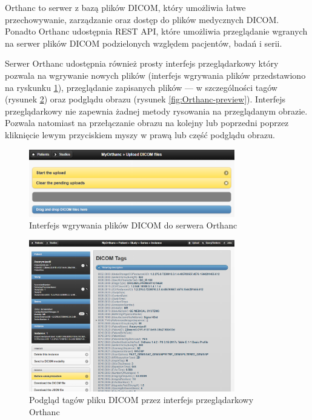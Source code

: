 \documentclass[a4paper,11pt,twoside]{report}
\theoremstyle{definition}
\begin{document}
Orthanc to serwer z bazą plików DICOM, który umożliwia łatwe przechowywanie, zarządzanie oraz dostęp do plików medycznych DICOM. Ponadto Orthanc udostępnia REST API, które umożliwia przeglądanie wgranych na serwer plików DICOM podzielonych względem pacjentów, badań i serii. 

Serwer Orthanc udostępnia również prosty interfejs przeglądarkowy który pozwala na wgrywanie nowych plików (interfejs wgrywania plików przedstawiono na ryskunku \ref{fig:Orthanc-upload}), przeglądanie zapisanych plików --- w szczególności tagów (rysunek \ref{fig:Orthanc-tags}) oraz podglądu obrazu (rysunek \ref{fig:Orthanc-preview}). Interfejs przeglądarkowy nie zapewnia żadnej metody rysowania na przeglądanym obrazie. Pozwala natomiast na przełączanie obrazu na kolejny lub poprzedni poprzez kliknięcie lewym przyciskiem myszy w prawą lub część podglądu obrazu.

\begin{figure}[h]
	\center
	\includegraphics[width=0.8\textwidth]{Orthanc-upload}
	\caption{Interfejs wgrywania plików DICOM do serwera Orthanc}
    	\label{fig:Orthanc-upload}
\end{figure}

\begin{figure}[h]
	\center
	\includegraphics[width=0.8\textwidth]{Orthanc-tags}
	\caption{Podgląd tagów pliku DICOM przez interfejs przeglądarkowy Orthanc}
    	\label{fig:Orthanc-tags}
\end{figure}
\end{document}
